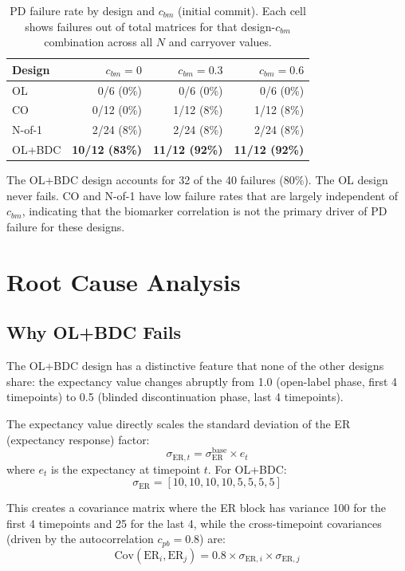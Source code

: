 \documentclass[11pt]{article}
\begin{document}
\begin{table}[h]
\centering
\caption{PD failure rate by design and $c_{bm}$ (initial
  commit). Each cell shows failures out of total matrices for
  that design-$c_{bm}$ combination across all $N$ and
  carryover values.}
\begin{tabular}{lrrr}
\toprule
Design & $c_{bm} = 0$ & $c_{bm} = 0.3$ &
  $c_{bm} = 0.6$ \\
\midrule
OL & 0/6 (0\%) & 0/6 (0\%) & 0/6 (0\%) \\
CO & 0/12 (0\%) & 1/12 (8\%) & 1/12 (8\%) \\
N-of-1 & 2/24 (8\%) & 2/24 (8\%) & 2/24 (8\%) \\
OL+BDC & \textbf{10/12 (83\%)} & \textbf{11/12 (92\%)} &
  \textbf{11/12 (92\%)} \\
\bottomrule
\end{tabular}
\label{tab:breakdown}
\end{table}

The OL+BDC design accounts for 32 of the 40 failures (80\%).
The OL design never fails. CO and N-of-1 have low failure rates
that are largely independent of $c_{bm}$, indicating that the
biomarker correlation is not the primary driver of PD failure
for these designs.

\section{Root Cause Analysis}

\subsection{Why OL+BDC Fails}

The OL+BDC design has a distinctive feature that none of the
other designs share: the expectancy value changes abruptly from
1.0 (open-label phase, first 4 timepoints) to 0.5 (blinded
discontinuation phase, last 4 timepoints).

The expectancy value directly scales the standard deviation of
the ER (expectancy response) factor:
\[
\sigma_{\text{ER},t} =
  \sigma_{\text{ER}}^{\text{base}} \times e_t
\]
where $e_t$ is the expectancy at timepoint $t$. For OL+BDC:
\[
\sigma_{\text{ER}} =
  [10, 10, 10, 10, 5, 5, 5, 5]
\]

This creates a covariance matrix where the ER block has
variance 100 for the first 4 timepoints and 25 for the last 4,
while the cross-timepoint covariances (driven by the
autocorrelation $c_{pb} = 0.8$) are:
\[
\text{Cov}(\text{ER}_i, \text{ER}_j) =
  0.8 \times \sigma_{\text{ER},i} \times
  \sigma_{\text{ER},j}
\]
\end{document}
